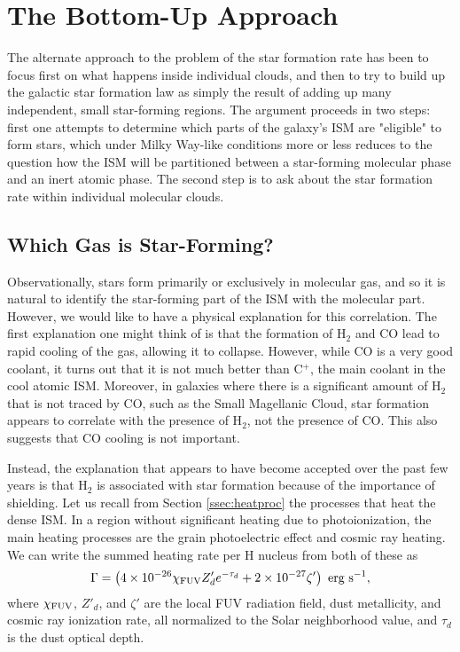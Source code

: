 \section{The Bottom-Up Approach}

The alternate approach to the problem of the star formation rate has been to focus first on what happens inside individual clouds, and then to try to build up the galactic star formation law as simply the result of adding up many independent, small star-forming regions. The argument proceeds in two steps: first one attempts to determine which parts of the galaxy's ISM are "eligible" to form stars, which under Milky Way-like conditions more or less reduces to the question how the ISM will be partitioned between a star-forming molecular phase and an inert atomic phase. The second step is to ask about the star formation rate within individual molecular clouds.

\subsection{Which Gas is Star-Forming?}

Observationally, stars form primarily or exclusively in molecular gas, and so it is natural to identify the star-forming part of the ISM with the molecular part. However, we would like to have a physical explanation for this correlation. The first explanation one might think of is that the formation of H$_2$ and CO lead to rapid cooling of the gas, allowing it to collapse. However, while CO is a very good coolant, it turns out that it is not much better than C$^+$, the main coolant in the cool atomic ISM. Moreover, in galaxies where there is a significant amount of H$_2$ that is not traced by CO, such as the Small Magellanic Cloud, star formation appears to correlate with the presence of H$_2$, not the presence of CO. This also suggests that CO cooling is not important.

Instead, the explanation that appears to have become accepted over the past few years is that H$_2$ is associated with star formation because of the importance of shielding. Let us recall from Section \ref{ssec:heatproc} the processes that heat the dense ISM. In a region without significant heating due to photoionization, the main heating processes are the grain photoelectric effect and cosmic ray heating. We can write the summed heating rate per H nucleus from both of these as
\begin{equation}
\Gamma = \left(4\times 10^{-26} \chi_{\rm FUV} Z'_d e^{-\tau_d} + 2\times 10^{-27} \zeta'\right) \mbox{ erg s}^{-1},
\end{equation}
where $\chi_{\rm FUV}$, $Z'_d$, and $\zeta'$ are the local FUV radiation field, dust metallicity, and cosmic ray ionization rate, all normalized to the Solar neighborhood value, and $\tau_d$ is the dust optical depth.

